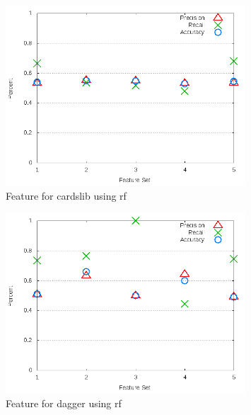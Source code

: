 \begin{figure}[!t]
\centering
\includegraphics[width=0.8\textwidth]{images/rf/test_3/cardslib_sample_range.png}
\caption{Feature for cardslib using \gls{rf}}
\label{fig:test_3_cardslib_rf}
\end{figure}

\begin{figure}[!t]
\centering
\includegraphics[width=0.8\textwidth]{images/rf/test_3/dagger_sample_range.png}
\caption{Feature for dagger using \gls{rf}}
\label{fig:test_3_dagger_rf}
\end{figure}

